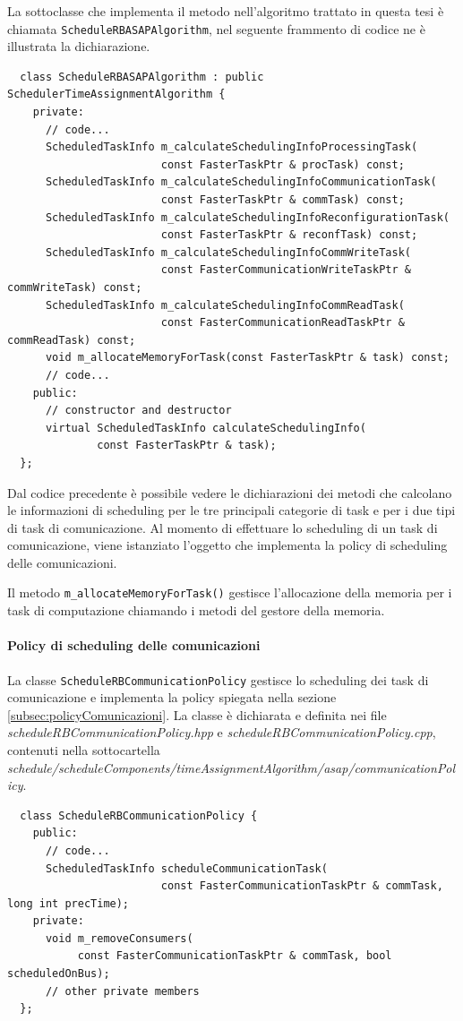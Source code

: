 La sottoclasse che implementa il metodo nell'algoritmo trattato in questa tesi 
è chiamata \verb+ScheduleRBASAPAlgorithm+, nel seguente frammento di codice ne 
è illustrata la dichiarazione.
\newline
\begin{verbatim}
  class ScheduleRBASAPAlgorithm : public SchedulerTimeAssignmentAlgorithm {
    private:
      // code...
      ScheduledTaskInfo m_calculateSchedulingInfoProcessingTask(
                        const FasterTaskPtr & procTask) const;
      ScheduledTaskInfo m_calculateSchedulingInfoCommunicationTask(
                        const FasterTaskPtr & commTask) const;
      ScheduledTaskInfo m_calculateSchedulingInfoReconfigurationTask(
                        const FasterTaskPtr & reconfTask) const;
      ScheduledTaskInfo m_calculateSchedulingInfoCommWriteTask(
                        const FasterCommunicationWriteTaskPtr & commWriteTask) const;
      ScheduledTaskInfo m_calculateSchedulingInfoCommReadTask(
                        const FasterCommunicationReadTaskPtr & commReadTask) const;
      void m_allocateMemoryForTask(const FasterTaskPtr & task) const;
      // code...
    public:
      // constructor and destructor
      virtual ScheduledTaskInfo calculateSchedulingInfo(
              const FasterTaskPtr & task);
  };
\end{verbatim}
Dal codice precedente è possibile vedere le dichiarazioni dei metodi che 
calcolano le informazioni di scheduling per le tre principali categorie di 
task e per i due tipi di task di comunicazione. Al momento di effettuare lo 
scheduling di un task di comunicazione, viene istanziato l'oggetto che 
implementa la policy di scheduling delle comunicazioni.

Il metodo \verb+m_allocateMemoryForTask()+ gestisce l'allocazione della memoria 
per i task di computazione chiamando i metodi del gestore della memoria.

\paragraph{Policy di scheduling delle comunicazioni}
La classe \verb+ScheduleRBCommunicationPolicy+ gestisce lo scheduling dei task 
di comunicazione e implementa la policy spiegata nella sezione 
\ref{subsec:policyComunicazioni}. La classe è dichiarata e definita nei file 
\emph{scheduleRBCommunicationPolicy.hpp} e  \emph{scheduleRBCommunicationPolicy.cpp},
contenuti nella sottocartella  \emph{schedule/scheduleComponents/timeAssignmentAlgorithm/asap/communicationPolicy}.
\newline
\begin{verbatim}
  class ScheduleRBCommunicationPolicy {
    public:
      // code...
      ScheduledTaskInfo scheduleCommunicationTask(
                        const FasterCommunicationTaskPtr & commTask, long int precTime);
    private:
      void m_removeConsumers(
           const FasterCommunicationTaskPtr & commTask, bool scheduledOnBus);
      // other private members
  };
\end{verbatim}

